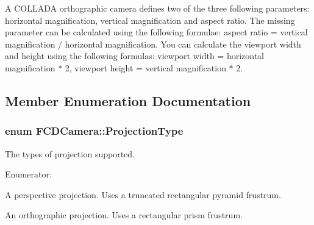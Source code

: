 A COLLADA orthographic camera defines two of the three following parameters: horizontal magnification, vertical magnification and aspect ratio. The missing parameter can be calculated using the following formulae: aspect ratio = vertical magnification / horizontal magnification. You can calculate the viewport width and height using the following formulas: viewport width = horizontal magnification $\ast$ 2, viewport height = vertical magnification $\ast$ 2. 

\subsection{Member Enumeration Documentation}
\hypertarget{classFCDCamera_a6afb103bc3857a0e059dc0174a48616d}{
\subsubsection[{ProjectionType}]{\setlength{\rightskip}{0pt plus 5cm}enum {\bf FCDCamera::ProjectionType}}}
\label{classFCDCamera_a6afb103bc3857a0e059dc0174a48616d}
The types of projection supported. \begin{Desc}
\item[Enumerator: ]\par
\begin{description}
\item[{\em 
\hypertarget{classFCDCamera_a6afb103bc3857a0e059dc0174a48616da92a6de5e36f59329c5d290c6da31a5bc}{
PERSPECTIVE}
\label{classFCDCamera_a6afb103bc3857a0e059dc0174a48616da92a6de5e36f59329c5d290c6da31a5bc}
}]A perspective projection. Uses a truncated rectangular pyramid frustrum. \item[{\em 
\hypertarget{classFCDCamera_a6afb103bc3857a0e059dc0174a48616da34b6cc066d8993d265896628316c6138}{
ORTHOGRAPHIC}
\label{classFCDCamera_a6afb103bc3857a0e059dc0174a48616da34b6cc066d8993d265896628316c6138}
}]An orthographic projection. Uses a rectangular prism frustrum. \end{description}
\end{Desc}



